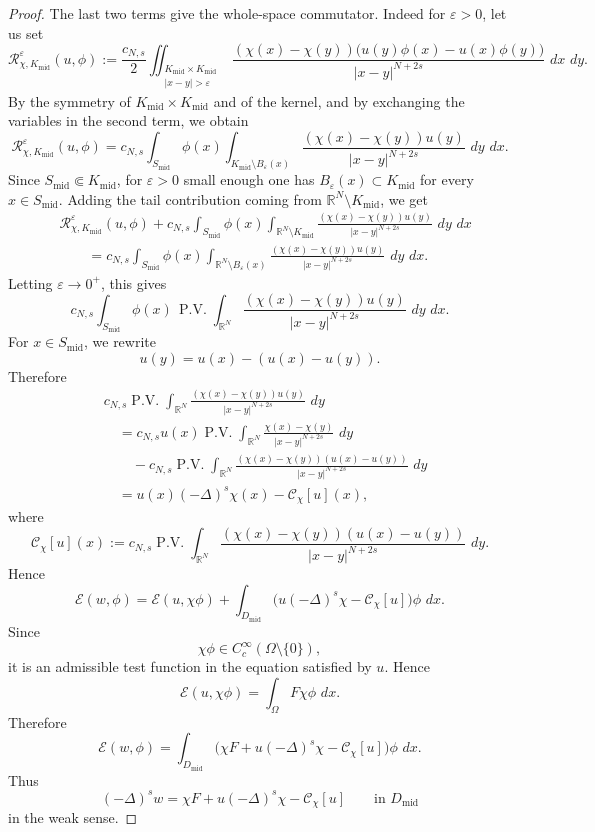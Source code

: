 \documentclass[11pt,a4paper]{article}
\newcommand{\dd}{\,d}
\newcommand{\PV}{\operatorname{P.V.}}
\begin{document}
\begin{proof}
The last two terms give the whole-space commutator. Indeed for \(\varepsilon>0\), let us set
\[
\mathcal R_{\chi,K_{\mathrm{mid}}}^{\varepsilon}(u,\phi)
:=
\frac{c_{N,s}}2
\iint_{\substack{K_{\mathrm{mid}}\times K_{\mathrm{mid}}\\ |x-y|>\varepsilon}}
\frac{
(\chi(x)-\chi(y))
\bigl(u(y)\phi(x)-u(x)\phi(y)\bigr)}
{|x-y|^{N+2s}}
\,\dd x\,\dd y.
\]
By the symmetry of \(K_{\mathrm{mid}}\times K_{\mathrm{mid}}\) and of the
kernel, and by exchanging the variables in the second term, we obtain
\[
\mathcal R_{\chi,K_{\mathrm{mid}}}^{\varepsilon}(u,\phi)
=
c_{N,s}
\int_{S_{\mathrm{mid}}}\phi(x)
\int_{K_{\mathrm{mid}}\setminus B_\varepsilon(x)}
\frac{(\chi(x)-\chi(y))u(y)}
{|x-y|^{N+2s}}
\,\dd y\,\dd x .
\]
Since \(S_{\mathrm{mid}}\Subset K_{\mathrm{mid}}\), for \(\varepsilon>0\)
small enough one has \(B_\varepsilon(x)\subset K_{\mathrm{mid}}\) for every
\(x\in S_{\mathrm{mid}}\). Adding the tail contribution coming from
\(\mathbb R^N\setminus K_{\mathrm{mid}}\), we get
\[
\begin{aligned}
&\mathcal R_{\chi,K_{\mathrm{mid}}}^{\varepsilon}(u,\phi)
+
c_{N,s}
\int_{S_{\mathrm{mid}}}\phi(x)
\int_{\mathbb R^N\setminus K_{\mathrm{mid}}}
\frac{(\chi(x)-\chi(y))u(y)}
{|x-y|^{N+2s}}
\,\dd y\,\dd x\\
&\qquad =
c_{N,s}
\int_{S_{\mathrm{mid}}}\phi(x)
\int_{\mathbb R^N\setminus B_\varepsilon(x)}
\frac{(\chi(x)-\chi(y))u(y)}
{|x-y|^{N+2s}}
\,\dd y\,\dd x.
\end{aligned}
\]
Letting \(\varepsilon\to0^+\), this gives
\[
c_{N,s}
\int_{S_{\mathrm{mid}}}\phi(x)\,
\PV\int_{\mathbb R^N}
\frac{(\chi(x)-\chi(y))u(y)}
{|x-y|^{N+2s}}
\,\dd y\,\dd x.
\]
For \(x\in S_{\mathrm{mid}}\), we rewrite
\[
u(y)=u(x)-(u(x)-u(y)).
\]
Therefore
\[
\begin{aligned}
&c_{N,s}\PV\int_{\mathbb R^N}
\frac{(\chi(x)-\chi(y))u(y)}
{|x-y|^{N+2s}}
\,\dd y\\
&\quad =
c_{N,s}u(x)\PV\int_{\mathbb R^N}
\frac{\chi(x)-\chi(y)}
{|x-y|^{N+2s}}
\,\dd y\\
&\qquad -
c_{N,s}\PV\int_{\mathbb R^N}
\frac{(\chi(x)-\chi(y))(u(x)-u(y))}
{|x-y|^{N+2s}}
\,\dd y\\
&\quad =
u(x)(-\Delta)^s\chi(x)-\mathcal C_\chi[u](x),
\end{aligned}
\]
where
\[
\mathcal C_\chi[u](x)
:=
c_{N,s}\PV\int_{\mathbb R^N}
\frac{(\chi(x)-\chi(y))(u(x)-u(y))}
{|x-y|^{N+2s}}
\,\dd y.
\]
Hence
\[
\mathcal E(w,\phi)
=
\mathcal E(u,\chi\phi)
+
\int_{D_{\mathrm{mid}}}
\bigl(u(-\Delta)^s\chi-\mathcal C_\chi[u]\bigr)\phi\,\dd x.
\]
Since
\[
\chi\phi\in C_c^\infty(\Omega\setminus\{0\}),
\]
it is an admissible test function in the equation satisfied by \(u\). Hence
\[
\mathcal E(u,\chi\phi)
=
\int_\Omega F\chi\phi\,\dd x.
\]
Therefore
\[
\mathcal E(w,\phi)
=
\int_{D_{\mathrm{mid}}}
\bigl(\chi F+u(-\Delta)^s\chi-\mathcal C_\chi[u]\bigr)\phi\,\dd x.
\]
Thus
\[
(-\Delta)^s w
=
\chi F+u(-\Delta)^s\chi-\mathcal C_\chi[u]
\qquad\text{in }D_{\mathrm{mid}}
\]
in the weak sense.


\end{proof}
\end{document}
